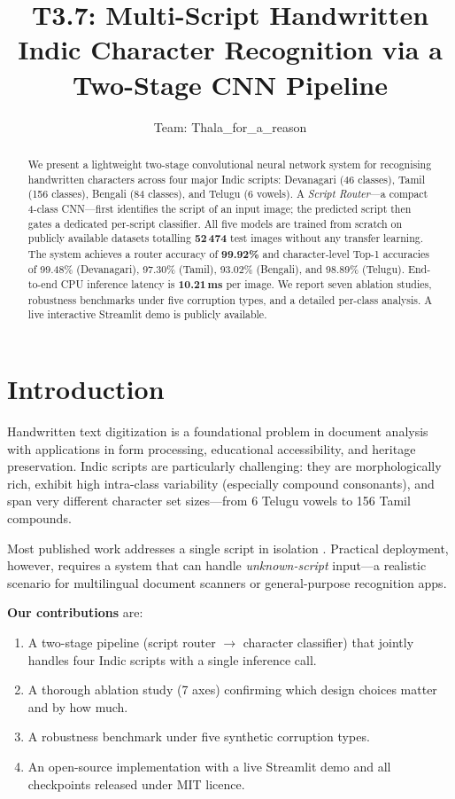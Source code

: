 \documentclass[10pt,twocolumn]{article}
\title{\textbf{T3.7: Multi-Script Handwritten Indic Character Recognition via a Two-Stage CNN Pipeline}}
\author{Team: Thala\_for\_a\_reason}
\date{}
\begin{document}
\maketitle

\begin{abstract}
We present a lightweight two-stage convolutional neural network system for
recognising handwritten characters across four major Indic scripts: Devanagari
(46 classes), Tamil (156 classes), Bengali (84 classes), and Telugu (6 vowels).
A \emph{Script Router}---a compact 4-class CNN---first identifies the script of
an input image; the predicted script then gates a dedicated per-script
classifier.  All five models are trained from scratch on publicly available
datasets totalling \textbf{52\,474} test images without any transfer learning.
The system achieves a router accuracy of \textbf{99.92\%} and character-level
Top-1 accuracies of 99.48\% (Devanagari), 97.30\% (Tamil), 93.02\%
(Bengali), and 98.89\% (Telugu).  End-to-end CPU inference latency is
\textbf{10.21\,ms} per image.  We report seven ablation studies, robustness
benchmarks under five corruption types, and a detailed per-class analysis.
A live interactive Streamlit demo is publicly available.
\end{abstract}

\section{Introduction}

Handwritten text digitization is a foundational problem in document analysis
with applications in form processing, educational accessibility, and heritage
preservation.  Indic scripts are particularly challenging: they are
morphologically rich, exhibit high intra-class variability (especially
compound consonants), and span very different character set sizes---from
6 Telugu vowels to 156 Tamil compounds.

Most published work addresses a single script in isolation
\cite{acharya2015,pal2011,bhattacharya2012}.  Practical deployment, however,
requires a system that can handle \emph{unknown-script} input---a realistic
scenario for multilingual document scanners or general-purpose recognition
apps.

\textbf{Our contributions} are:
\begin{enumerate}[leftmargin=*,noitemsep]
  \item A two-stage pipeline (script router $\to$ character classifier) that
        jointly handles four Indic scripts with a single inference call.
  \item A thorough ablation study (7 axes) confirming which design choices
        matter and by how much.
  \item A robustness benchmark under five synthetic corruption types.
  \item An open-source implementation with a live Streamlit demo and all
        checkpoints released under MIT licence.
\end{enumerate}
\end{document}
